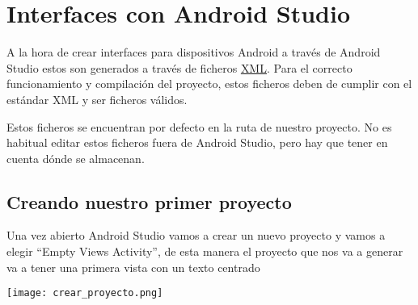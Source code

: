 \chapter{Interfaces con Android Studio}

A la hora de crear interfaces para dispositivos Android a través de Android Studio estos son generados a través de ficheros \href{https://es.wikipedia.org/wiki/Extensible_Markup_Language}{XML}. Para el correcto funcionamiento y compilación del proyecto, estos ficheros deben de cumplir con el estándar XML y ser ficheros válidos.


Estos ficheros se encuentran por defecto en la ruta  de nuestro proyecto. No es habitual editar estos ficheros fuera de Android Studio, pero hay que tener en cuenta dónde se almacenan.

\section{Creando nuestro primer proyecto}

Una vez abierto Android Studio vamos a crear un nuevo proyecto y vamos a elegir “Empty Views Activity”, de esta manera el proyecto que nos va a generar va a tener una primera vista con un texto centrado

\begin{center}
    \texttt{[image: crear\_proyecto.png]}
\end{center}
